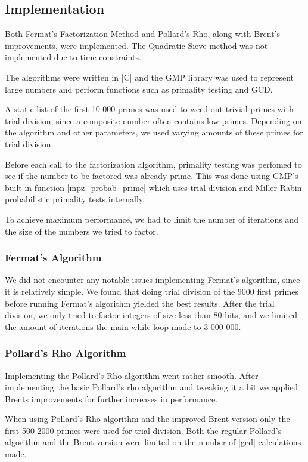 \documentclass[paper=a4, fontsize=11pt,numbers=endperiod]{scrartcl} %
\numberwithin{equation}{section} %
\numberwithin{figure}{section} %
\numberwithin{table}{section} %
\begin{document}

\subsection{Implementation}
Both Fermat's Factorization Method and Pollard's Rho, along with Brent's improvements, were implemented.
The Quadratic Sieve method was not implemented due to time constraints.

The algorithms were written in |C| and the GMP \cite{gmp} library was used to represent large numbers and perform functions such as primality testing and GCD.

A static list of the first 10 000 primes was used to weed out trivial primes with trial division, since a composite number often contains low primes.
Depending on the algorithm and other parameters, we used varying amounts of these primes for trial division.

Before each call to the factorization algorithm, primality testing was perfomed to see if the number to be factored was already prime.
This was done using GMP's built-in function |mpz_probab_prime| which uses trial division and Miller-Rabin probabilistic primality tests internally\cite{probabprime}.

To achieve maximum performance, we had to limit the number of iterations and the size of the numbers we tried to factor.

\subsubsection{Fermat's Algorithm}
We did not encounter any notable issues implementing Fermat's algorithm, since it is relatively simple.
We found that doing trial division of the 9000 first primes before running Fermat's algorithm yielded the best results.
After the trial division, we only tried to factor integers of size less than 80 bits, and we limited the amount of iterations the main while loop made to 3 000 000.

\subsubsection{Pollard's Rho Algorithm}
Implementing the Pollard's Rho algorithm went rather smooth.
After implementing the basic Pollard's rho algorithm and tweaking it a bit we applied Brents improvements for further increases in performance.

When using Pollard's Rho algorithm and the improved Brent version only the first 500-2000 primes were used for trial division.
Both the regular Pollard's algorithm and the Brent version were limited on the number of |gcd| calculations made.
\end{document}
